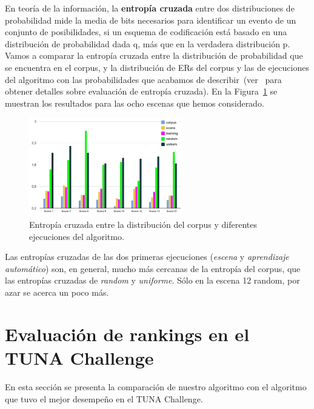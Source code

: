 En teor\'ia de la informaci\'on, la \textbf{entrop\'ia cruzada} entre dos distribuciones de probabilidad mide la media de bits necesarios para identificar un evento de un conjunto de posibilidades, si un esquema de codificaci\'on est\'a basado en una distribuci\'on de probabilidad dada q, m\'as que en la verdadera distribuci\'on p. Vamos a comparar la entrop\'ia cruzada entre la distribuci\'on de probabilidad que se encuentra en el corpus, y la distribuci\'on de ERs del corpus y las de ejecuciones del algoritmo con las probabilidades que acabamos de describir~(ver~\cite{juraksky:spee08} para obtener detalles sobre evaluaci\'on de entrop\'{i}a cruzada). En la Figura~\ref{Entropy} se muestran los resultados para las ocho escenas que hemos considerado.

\begin{figure}[h]
\centering
\includegraphics[width=0.6\textwidth]{images/entropy.jpg}
\caption{Entrop\'ia cruzada entre la distribuci\'on del corpus y diferentes ejecuciones del algoritmo.}\label{Entropy}
\end{figure}
  
Las entrop\'{i}as cruzadas de las dos primeras ejecuciones (\emph{escena} y \emph{aprendizaje autom\'atico}) son, en general, mucho m\'as cercanas de la entrop\'{i}a del corpus, que las entrop\'ias cruzadas de \emph{random} y \emph{uniforme}. S\'olo en la escena 12 random, por azar se acerca un poco m\'as.

\section{Evaluaci\'on de rankings en el TUNA Challenge} \label{sec:automaticevaluation}

En esta secci\'on se presenta la comparaci\'on de nuestro algoritmo con el algoritmo que tuvo el mejor desempe\~no en el TUNA Challenge. 


